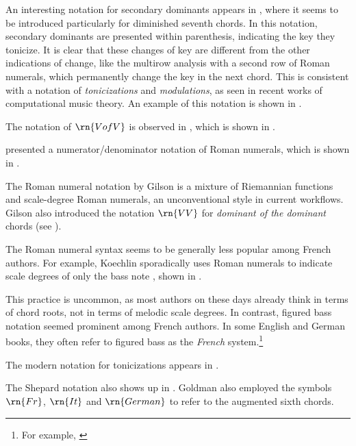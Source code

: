 An interesting notation for secondary dominants appears in
\textcite{white1911harmonic}, where it seems to be
introduced particularly for diminished seventh chords. In
this notation, secondary dominants are presented within
parenthesis, indicating the key they tonicize. It is clear
that these changes of key are different from the other
indications of change, like the multirow analysis with a
second row of Roman numerals, which permanently change the
key in the next chord. This is consistent with a notation of
\emph{tonicizations} and \emph{modulations}, as seen in
recent works of computational music theory. An example of
this notation is shown in
.


The notation of $\rn{V of V}$ is observed in
\textcite{mokrejs1913lessons}, which is shown in
.


\textcite{gilson1919traite} presented a
numerator/denominator notation of Roman numerals, which is
shown in .



The Roman numeral notation by Gilson is a mixture of
Riemannian functions and scale-degree Roman numerals, an
unconventional style in current workflows. Gilson also
introduced the notation $\rn{VV}$ for \emph{dominant of the
dominant} chords (see
).

The Roman numeral syntax seems to be generally less popular
among French authors. For example, Koechlin sporadically
uses Roman numerals to indicate scale degrees of only the
bass note \textcite{koechlin1928traite}, shown in
.


This practice is uncommon, as most authors on these days
already think in terms of chord roots, not in terms of
melodic scale degrees. In contrast, figured bass notation
seemed prominent among French authors. In some English and
German books, they often refer to figured bass as the
\emph{French} system.\footnote{For example,
\textcite{norris1894practical}}

The modern notation for tonicizations appears in
\textcite{tischler1964practical}.

The Shepard notation also shows up in
\textcite{goldman1965harmony}. Goldman also employed the
symbols $\rn{Fr}$, $\rn{It}$ and $\rn{German}$ to refer to
the augmented sixth chords.
